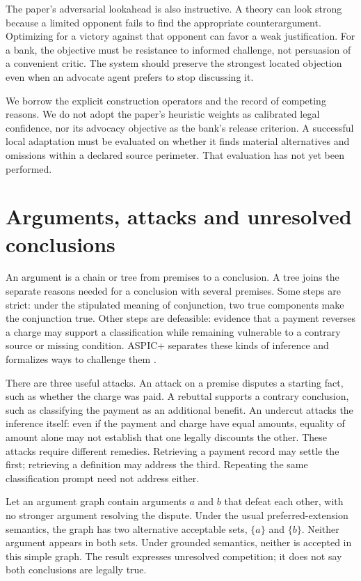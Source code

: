 \documentclass[12pt,a4paper,oneside,openany]{book}
\begin{document}
The paper's adversarial lookahead is also instructive. A theory can look strong
because a limited opponent fails to find the appropriate counterargument.
Optimizing for a victory against that opponent can favor a weak justification.
For a bank, the objective must be resistance to informed challenge, not persuasion
of a convenient critic. The system should preserve the strongest located
objection even when an advocate agent prefers to stop discussing it.

We borrow the explicit construction operators and the record of competing
reasons. We do not adopt the paper's heuristic weights as calibrated legal
confidence, nor its advocacy objective as the bank's release criterion. A
successful local adaptation must be evaluated on whether it finds material
alternatives and omissions within a declared source perimeter. That evaluation
has not yet been performed.

\section{Arguments, attacks and unresolved conclusions}
\label{merge:M05:04}


An argument is a chain or tree from premises to a conclusion. A tree joins
the separate reasons needed for a conclusion with several premises. Some steps are strict:
under the stipulated meaning of conjunction, two true components make the
conjunction true. Other steps are defeasible: evidence that a payment reverses a
charge may support a classification while remaining vulnerable to a contrary
source or missing condition. ASPIC+ separates these kinds of inference and
formalizes ways to challenge them \citep[sections 2--3]{aspic2010}.

There are three useful attacks. An attack on a premise disputes a starting fact,
such as whether the charge was paid. A rebuttal supports a contrary conclusion,
such as classifying the payment as an additional benefit. An undercut attacks the
inference itself: even if the payment and charge have equal amounts, equality of
amount alone may not establish that one legally discounts the other. These
attacks require different remedies. Retrieving a payment record may settle the
first; retrieving a definition may address the third. Repeating the same
classification prompt need not address either.

Let an argument graph contain arguments $a$ and $b$ that defeat each other, with
no stronger argument resolving the dispute. Under the usual preferred-extension
semantics, the graph has two alternative acceptable sets, $\{a\}$ and $\{b\}$.
Neither argument appears in both sets. Under grounded semantics, neither is
accepted in this simple graph. The result expresses unresolved competition; it
does not say both conclusions are legally true.
\end{document}
